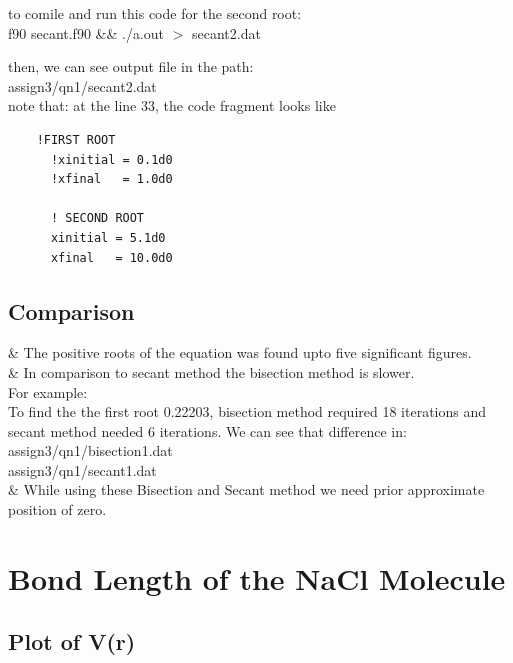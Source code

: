 \documentclass[11pt,a4paper,english]{article}
\newcommand{\begl}{\begin{easylist}}
\newcommand{\eegl}{\end{easylist}}
\begin{document}
	to comile and run this code for the second root:\\
	
	f90 secant.f90 \&\& ./a.out $>$ secant2.dat
	
	then, we can see output file in the path:\\
	assign3/qn1/secant2.dat\\
	
	note that: at the line 33, the code fragment looks like
	\begin{verbatim}
	!FIRST ROOT
      !xinitial = 0.1d0  
      !xfinal   = 1.0d0
       
      ! SECOND ROOT
      xinitial = 5.1d0  
      xfinal   = 10.0d0 
	\end{verbatim}
	
	
	
	
	
	\subsection{Comparison}
	\begl
	& The positive roots of the equation was found upto five significant figures.\\
	& In comparison to secant method the bisection method is slower.\\
	  For example: \\
	  To find the the first root 0.22203, bisection method required 18 iterations and secant method
	  needed 6 iterations.
	  We can see that difference in:\\
	  assign3/qn1/bisection1.dat\\
	  assign3/qn1/secant1.dat\\
	  
	& While using these Bisection and Secant method we need prior approximate position of zero.
	  
	  
	
	\eegl
	

	
	
\clearpage
\section{Bond Length of the NaCl Molecule}
\subsection{Plot of V(r)}
\end{document}
